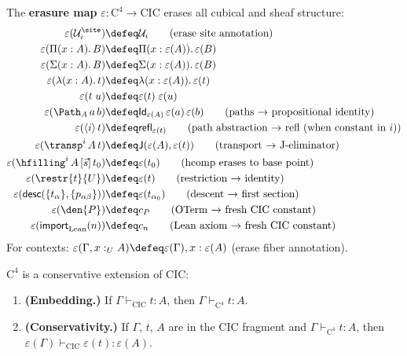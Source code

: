 \begin{definition}
\label{def:erasure-map}
The \textbf{erasure map} $\varepsilon : \mathrm{C}^4 \to \mathrm{CIC}$
erases all cubical and sheaf structure:
\begin{align}
  \varepsilon(\mathcal{U}_i^{\site}) &\defeq \mathcal{U}_i
    \tag{erase site annotation} \\
  \varepsilon(\Pi(x:A).\,B) &\defeq
    \Pi(x:\varepsilon(A)).\,\varepsilon(B) \\
  \varepsilon(\Sigma(x:A).\,B) &\defeq
    \Sigma(x:\varepsilon(A)).\,\varepsilon(B) \\
  \varepsilon(\lambda(x:A).\,t) &\defeq
    \lambda(x:\varepsilon(A)).\,\varepsilon(t) \\
  \varepsilon(t\; u) &\defeq \varepsilon(t)\; \varepsilon(u) \\
  \varepsilon(\Path_A\, a\, b) &\defeq
    \mathsf{Id}_{\varepsilon(A)}\, \varepsilon(a)\, \varepsilon(b)
    \tag{paths $\to$ propositional identity} \\
  \varepsilon(\langle i \rangle\, t) &\defeq
    \mathsf{refl}_{\varepsilon(t)}
    \tag{path abstraction $\to$ refl (when constant in $i$)} \\
  \varepsilon(\transp^i\, A\, t) &\defeq
    \mathsf{J}(\varepsilon(A), \varepsilon(t))
    \tag{transport $\to$ J-eliminator} \\
  \varepsilon(\hfilling^i\, A\, [\vec{s}]\, t_0) &\defeq
    \varepsilon(t_0)
    \tag{hcomp erases to base point} \\
  \varepsilon(\restr{t}{U}) &\defeq \varepsilon(t)
    \tag{restriction $\to$ identity} \\
  \varepsilon(\mathsf{desc}(\{t_\alpha\}, \{p_{\alpha\beta}\}))
    &\defeq \varepsilon(t_{\alpha_0})
    \tag{descent $\to$ first section} \\
  \varepsilon(\den{P}) &\defeq c_P
    \tag{OTerm $\to$ fresh CIC constant} \\
  \varepsilon(\mathsf{import}_\mathrm{Lean}(n)) &\defeq c_n
    \tag{Lean axiom $\to$ fresh CIC constant}
\end{align}
For contexts: $\varepsilon(\Gamma, x :_U A) \defeq
\varepsilon(\Gamma), x : \varepsilon(A)$ (erase fiber annotation).
\end{definition}

\begin{theorem}
\label{thm:conservativity-cic}
$\mathrm{C}^4$ is a conservative extension of CIC:
\begin{enumerate}
\item \textbf{(Embedding.)} If $\Gamma \vdash_\mathrm{CIC} t : A$,
  then $\Gamma \vdash_{\mathrm{C}^4} t : A$.
\item \textbf{(Conservativity.)} If $\Gamma$, $t$, $A$ are in the CIC
  fragment and $\Gamma \vdash_{\mathrm{C}^4} t : A$, then
  $\varepsilon(\Gamma) \vdash_\mathrm{CIC} \varepsilon(t) : \varepsilon(A)$.
\end{enumerate}
\end{theorem}


